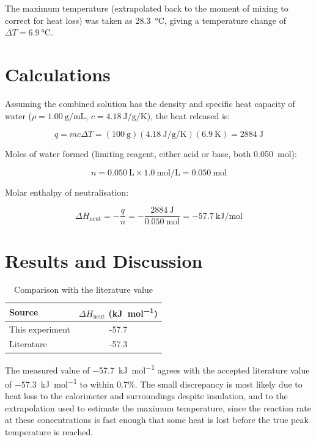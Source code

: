 \documentclass[a4paper,11pt]{article}
\begin{document}
The maximum temperature (extrapolated back to the moment of mixing to
correct for heat loss) was taken as \SI{28.3}{\celsius}, giving a temperature
change of $\Delta T = \SI{6.9}{\celsius}$.

\section*{Calculations}

Assuming the combined solution has the density and specific heat capacity
of water ($\rho = \SI{1.00}{\gram\per\milli\liter}$,
$c = \SI{4.18}{\joule\per\gram\per\kelvin}$), the heat released is:

\begin{equation}
  q = mc\Delta T = (100~\text{g})(\SI{4.18}{\joule\per\gram\per\kelvin})(6.9~\text{K}) = \SI{2884}{\joule}
\end{equation}

Moles of water formed (limiting reagent, either acid or base, both
\SI{0.050}{\mole}):

\begin{equation}
  n = \SI{0.050}{\liter} \times \SI{1.0}{\mole\per\liter} = \SI{0.050}{\mole}
\end{equation}

Molar enthalpy of neutralisation:

\begin{equation}
  \Delta H_\text{neut} = -\frac{q}{n} = -\frac{\SI{2884}{\joule}}{\SI{0.050}{\mole}} = \SI{-57.7}{\kilo\joule\per\mole}
\end{equation}

\section*{Results and Discussion}

\begin{table}[h]
  \centering
  \caption{Comparison with the literature value}
  \begin{tabular}{lS[table-format=-2.1]}
    \toprule
    {Source} & {$\Delta H_\text{neut}$ (\si{\kilo\joule\per\mole})} \\
    \midrule
    This experiment      & -57.7 \\
    Literature~\cite{atkins2018} & -57.3 \\
    \bottomrule
  \end{tabular}
\end{table}

The measured value of \SI{-57.7}{\kilo\joule\per\mole} agrees with the
accepted literature value of \SI{-57.3}{\kilo\joule\per\mole} to within
0.7\%. The small discrepancy is most likely due to heat loss to the
calorimeter and surroundings despite insulation, and to the extrapolation
used to estimate the maximum temperature, since the reaction rate at these
concentrations is fast enough that some heat is lost before the true peak
temperature is reached.
\end{document}
